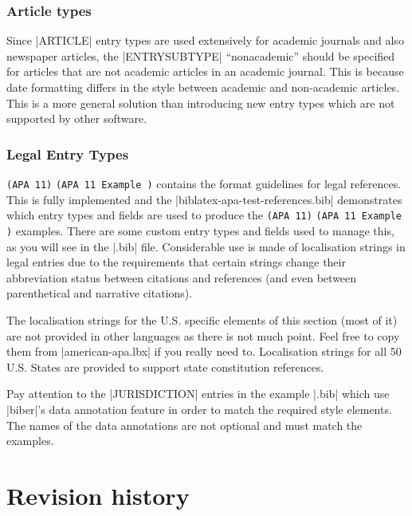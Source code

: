 \documentclass{ltxdockit}
\newcommand\apa[2][]{\ifthenelse{\equal{#1}{}}%
                       {\texttt{(APA #2)}}%
                       {\texttt{(APA #2 Example #1)}}}
\begin{document}
\subsubsection{Article types}

Since |ARTICLE| entry types are used extensively for academic journals and
also newspaper articles, the |ENTRYSUBTYPE| ``nonacademic'' should be specified
for articles that are not academic articles in an academic journal. This is
because date formatting differs in the style between academic and
non-academic articles. This is a more general solution than introducing new
entry types which are not supported by other software.

\subsubsection{Legal Entry Types}

\apa{11} contains the format guidelines for legal references. This is fully
implemented and the |biblatex-apa-test-references.bib| demonstrates which
entry types and fields are used to produce the \apa{11} examples. There are
some custom entry types and fields used to manage this, as you will see in
the |.bib| file. Considerable use is made of localisation strings in legal
entries due to the requirements that certain strings change their
abbreviation status between citations and references (and even between
parenthetical and narrative citations).

The localisation strings for the U.S. specific elements of this section
(most of it) are not provided in other languages as there is not much
point. Feel free to copy them from |american-apa.lbx| if you really need
to. Localisation strings for all 50 U.S. States are provided to support
state constitution references.

Pay attention to the |JURISDICTION| entries in the example |.bib| which use
|biber|'s data annotation feature in order to match the required style
elements. The names of the data annotations are not optional and must match
the examples.

\section{Revision history}\label{rev}
\end{document}
